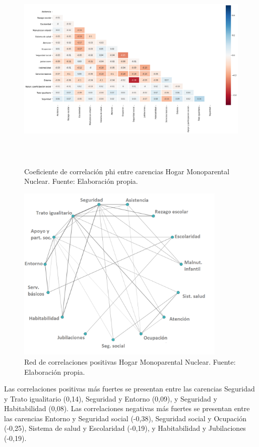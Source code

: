 \documentclass[12pt,letterpaper,spanish]{article}
\begin{document}
\begin{figure}[H]
    \centering
    \includegraphics[height=10cm]{Heatmaps/Heatmap_pearson_car_monuc.png}
    \caption{Coeficiente de correlación phi entre carencias Hogar Monoparental Nuclear. Fuente: Elaboración propia.}
    \label{HM_HMononuc}
\end{figure}

\begin{figure}[H]
  \centering

    \includegraphics[width=10cm]{Grafos/grafo_mononuc_pos.png}
    \caption{Red de correlaciones positivas Hogar Monoparental Nuclear. Fuente: Elaboración propia.}
    \label{RedMononucpos}

\end{figure}

Las correlaciones positivas más fuertes se presentan entre las carencias Seguridad y Trato igualitario (0,14), Seguridad y Entorno (0,09), y Seguridad y Habitabilidad (0,08). Las correlaciones negativas más fuertes se presentan entre las carencias Entorno y Seguridad social (-0,38), Seguridad social y Ocupación (-0,25), Sistema de salud y Escolaridad (-0,19), y Habitabilidad y Jubilaciones (-0,19).
\end{document}
